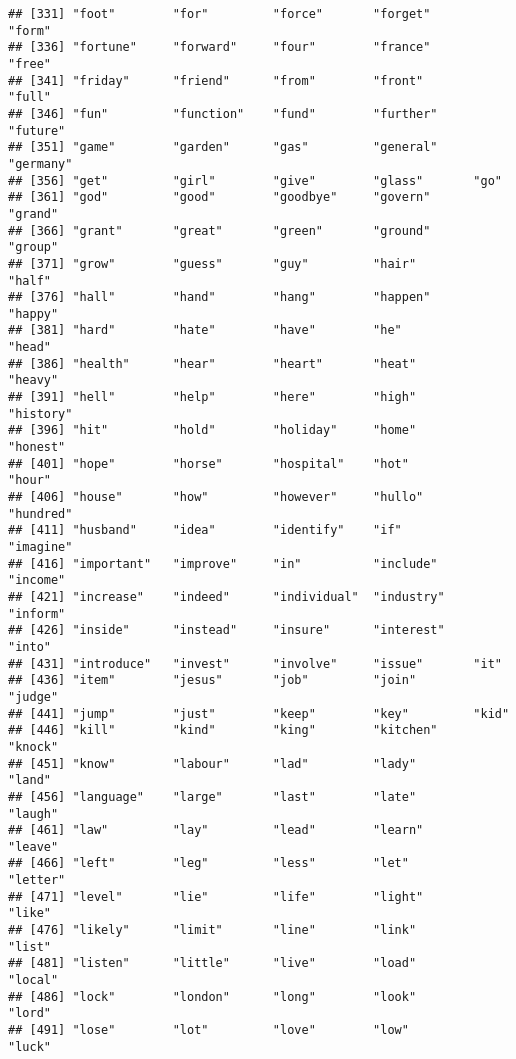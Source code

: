 \documentclass[
]{article}
\begin{document}
\begin{verbatim}
## [331] "foot"        "for"         "force"       "forget"      "form"       
## [336] "fortune"     "forward"     "four"        "france"      "free"       
## [341] "friday"      "friend"      "from"        "front"       "full"       
## [346] "fun"         "function"    "fund"        "further"     "future"     
## [351] "game"        "garden"      "gas"         "general"     "germany"    
## [356] "get"         "girl"        "give"        "glass"       "go"         
## [361] "god"         "good"        "goodbye"     "govern"      "grand"      
## [366] "grant"       "great"       "green"       "ground"      "group"      
## [371] "grow"        "guess"       "guy"         "hair"        "half"       
## [376] "hall"        "hand"        "hang"        "happen"      "happy"      
## [381] "hard"        "hate"        "have"        "he"          "head"       
## [386] "health"      "hear"        "heart"       "heat"        "heavy"      
## [391] "hell"        "help"        "here"        "high"        "history"    
## [396] "hit"         "hold"        "holiday"     "home"        "honest"     
## [401] "hope"        "horse"       "hospital"    "hot"         "hour"       
## [406] "house"       "how"         "however"     "hullo"       "hundred"    
## [411] "husband"     "idea"        "identify"    "if"          "imagine"    
## [416] "important"   "improve"     "in"          "include"     "income"     
## [421] "increase"    "indeed"      "individual"  "industry"    "inform"     
## [426] "inside"      "instead"     "insure"      "interest"    "into"       
## [431] "introduce"   "invest"      "involve"     "issue"       "it"         
## [436] "item"        "jesus"       "job"         "join"        "judge"      
## [441] "jump"        "just"        "keep"        "key"         "kid"        
## [446] "kill"        "kind"        "king"        "kitchen"     "knock"      
## [451] "know"        "labour"      "lad"         "lady"        "land"       
## [456] "language"    "large"       "last"        "late"        "laugh"      
## [461] "law"         "lay"         "lead"        "learn"       "leave"      
## [466] "left"        "leg"         "less"        "let"         "letter"     
## [471] "level"       "lie"         "life"        "light"       "like"       
## [476] "likely"      "limit"       "line"        "link"        "list"       
## [481] "listen"      "little"      "live"        "load"        "local"      
## [486] "lock"        "london"      "long"        "look"        "lord"       
## [491] "lose"        "lot"         "love"        "low"         "luck"       

\end{verbatim}
\end{document}
